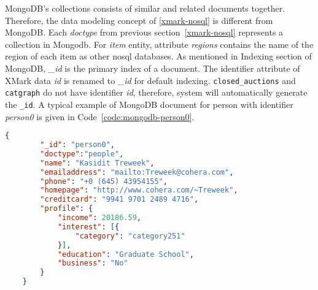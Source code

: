 MongoDB's collections consists of  similar and related documents together. Therefore, the data modeling concept of \ref{xmark-nosql} is different from MongoDB. Each \textit{doctype} from previous section~\ref{xmark-nosql} represents a collection in Mongodb. For \textit{item} entity,  attribute \textit{regions} contains the name of the region of each item as other nosql databases. As  mentioned in Indexing section of MongoDB, \textit{\_id} is the primary index of a document. 
The identifier attribute of XMark data \textit{id} is renamed to \textit{\_id} for default indexing.  \texttt{closed\_auctions} and \texttt{catgraph} do not have identifier \textit{id}, therefore, system will automatically generate the \texttt{\_id}. A typical example of MongoDB document for person with identifier \textit{person0} is given in Code~\ref{code:mongodb-person0}.	
\begin{lstlisting}[language=JSON,caption=Mongodb's document representation of XMARk data, label=code:mongodb-person0]
	{
		"_id": "person0",
		"doctype":"people",
		"name": "Kasidit Treweek",
		"emailaddress": "mailto:Treweek@cohera.com",
		"phone": "+0 (645) 43954155",
		"homepage": "http://www.cohera.com/~Treweek",
		"creditcard": "9941 9701 2489 4716",
		"profile": {
			"income": 20186.59,
			"interest": [{
				"category": "category251"
			}],
			"education": "Graduate School",
			"business": "No"
		}
	}
\end{lstlisting}
	
